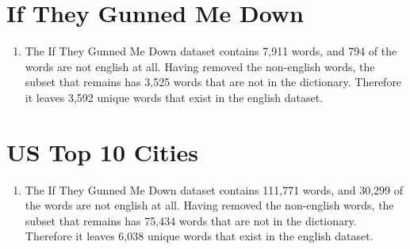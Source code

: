 \documentclass[11pt, oneside]{article}
\begin{document}
\section*{If They Gunned Me Down}

\begin{enumerate}
\item The If They Gunned Me Down dataset contains 7,911 words, and 794 of the words are not english at all. Having removed the non-english words, the subset that remains has 3,525 words that are not in the dictionary. Therefore it leaves 3,592 unique words that exist in the english dataset. 
\end{enumerate}

\section*{US Top 10 Cities}

\begin{enumerate}
\item The If They Gunned Me Down dataset contains 111,771 words, and 30,299 of the words are not english at all. Having removed the non-english words, the subset that remains has 75,434 words that are not in the dictionary. Therefore it leaves 6,038 unique words that exist in the english dataset. 
\end{enumerate}
\end{document}
